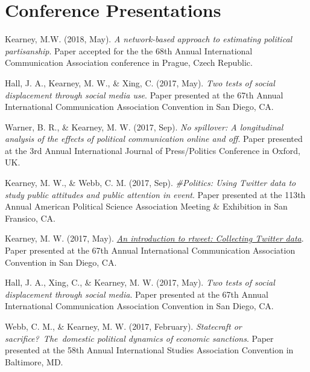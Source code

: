 \documentclass[11pt,letterpaper]{article}
\begin{document}
\section{Conference Presentations}
  \begin{bibenum}
    \item[] Kearney, M.W. (2018, May). \textit{A network-based approach to
      estimating political partisanship}. Paper accepted for the the
      68th Annual International Communication Association conference in
      Prague, Czech Republic.

    \item[] Hall, J. A., Kearney, M. W., \& Xing, C. (2017,
      May). \textit{Two tests of social displacement through social media
      use}. Paper presented at the 67th Annual International
      Communication Association Convention in San Diego, CA.

    \item[] Warner, B. R., \& Kearney, M. W. (2017, Sep). \textit{No
      spillover: A longitudinal analysis of the effects of political
      communication online and off}. Paper presented at the 3rd Annual
      International Journal of Press/Politics Conference in Oxford, UK.

    \item[] Kearney, M. W., \& Webb, C. M. (2017, Sep). \textit{\#Politics:
      Using Twitter data to study public attitudes and public attention
      in event}. Paper presented at the 113th Annual American Political
      Science Association Meeting \& Exhibition in San Fransico, CA.

    \item[] Kearney, M. W. (2017, May).
      \href{https://mkearney.github.io/ica17/}{\textit{An introduction to rtweet:
      Collecting Twitter data}}. Paper presented at the 67th Annual
      International Communication Association Convention in San Diego, CA.

    \item[] Hall, J. A., Xing, C., \& Kearney, M. W. (2017, May).
      \textit{Two tests of social displacement through social media}.
      Paper presented at the 67th Annual International Communication Association
      Convention in San Diego, CA.

    \item[] Webb, C. M., \& Kearney, M. W. (2017, February).
      \textit{Statecraft or sacrifice? The domestic political dynamics of
      economic sanctions}. Paper presented at the 58th Annual
      International Studies Association Convention in Baltimore, MD.


\end{bibenum}
\end{document}
